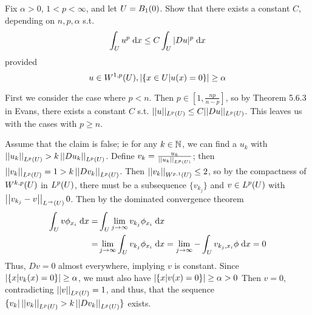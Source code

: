 Fix $\alpha > 0$, $1 < p < \infty$, and let $U = B_1(0)$.
Show that there exists a constant $C$, depending on $n, p, \alpha$ s.t.
$$
\int_U u^p \;\mathrm{d}x \leq C \int_U |D u|^p \;\mathrm{d}x
$$
provided
$$
u \in W^{1, p}(U), |\{ x \in U | u(x) = 0 \}| \geq \alpha
$$

First we consider the case where $p < n$.
Then $p \in \left[1, \frac{n p}{n - p}\right]$, so by Theorem 5.6.3 in Evans, there exists a constant $C$ s.t.
$||u||_{L^p(U)} \leq C ||D u||_{L^p(U)}$.
This leaves us with the cases with $p \geq n$.

Assume that the claim is false; ie for any $k \in \mathbb{N}$, we can find a $u_k$
with $\left|\left|u_k\right|\right|_{L^{p}(U)} > k \left|\left|D u_k\right|\right|_{L^{p}(U)}$.
Define $v_k = \frac{u_k}{\left|\left|u_k\right|\right|_{L^{p}(U)}}$; then $\left|\left|v_k\right|\right|_{L^{p}(U)} = 1 > k \left|\left|D v_k\right|\right|_{L^{p}(U)}$.
Then $\left|\left|v_k\right|\right|_{W^{p, 1}(U)} \leq 2$, so by the compactness of $W^{k, p}(U)$ in $L^p(U)$,
there must be a subsequence $\{ v_{k_j} \}$ and $v \in L^p(U)$ with $\left|\left|v_{k_j} - v\right|\right|_{L^{\rightarrow}(U)} 0$.
Then by the dominated convergence theorem
\begin{align*}
  \int_{U} v \phi_{x_i} \;\mathrm{d}x = &\int_{U} \lim \limits_{j \rightarrow \infty} v_{k_j} \phi_{x_i} \;\mathrm{d}x\\
    = &\lim \limits_{j \rightarrow \infty} \int_{U} v_{k_j} \phi_{x_i} \;\mathrm{d}x
    = \lim \limits_{j \rightarrow \infty} -\int_{U} v_{k_j, x_i} \phi \;\mathrm{d}x = 0
\end{align*}
Thus, $D v = 0$ almost everywhere, implying $v$ is constant.
Since $|\{ x | v_k(x) = 0 \}| \geq \alpha$, we must also have $|\{ x | v(x) = 0 \}| \geq \alpha >0$
Then $v = 0$, contradicting $\left|\left|v\right|\right|_{L^{p}(U)} = 1$, and thus, that the sequence
$\{ v_k | \left|\left|v_k\right|\right|_{L^{p}(U)} > k \left|\left|D v_k\right|\right|_{L^{p}(U)} \}$ exists.
